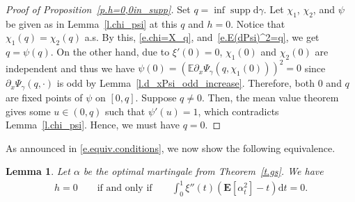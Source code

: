 \documentclass[11pt]{amsart}
\newtheorem{lemma}[proposition]{Lemma}
\theoremstyle{remark}
\theoremstyle{definition}
\numberwithin{equation}{section}
\numberwithin{proposition}{section}
\numberwithin{figure}{section}
\numberwithin{table}{section}
\newcommand{\E}{\mathbb{E}}
\newcommand{\EE}{\mathbf{E}}
\newcommand{\Ll}{\left}
\newcommand{\Rr}{\right}
\renewcommand{\d}{\mathrm{d}}
\newcommand{\1}{\mathbf{1}}
\DeclareMathOperator{\supp}{supp}
\begin{document}
\begin{proof}[Proof of Proposition~\ref{p.h=0,0in_supp}]
Set $q=\inf\supp\d\gamma$.
Let $\chi_1$, $\chi_2$, and $\psi$ be given as in Lemma~\ref{l.chi_psi} at this $q$ and $h=0$. Notice that $\chi_1(q)=\chi_2(q)$ a.s. By this, \eqref{e.chi=X_q}, and~\eqref{e.E(dPsi)^2=q}, we get $q=\psi(q)$. On the other hand, due to $\xi'(0)=0$, $\chi_1(0)$ and $\chi_2(0)$ are independent and thus we have $\psi(0)= \Ll(\E \partial_x\Psi_\gamma(q,\chi_1(0))\Rr)^2=0$ since $\partial_x\Psi_\gamma(q,\cdot)$ is odd by Lemma~\ref{l.d_xPsi_odd_increase}. Therefore, both $0$ and $q$ are fixed points of $\psi$ on $[0,q]$. Suppose $q\neq 0$. Then, the mean value theorem gives some $u\in(0,q)$ such that $\psi'(u)=1$, which contradicts Lemma~\ref{l.chi_psi}. Hence, we must have $q=0$.
\end{proof}

As announced in \eqref{e.equiv.conditions}, we now show the following equivalence.
\begin{lemma}\label{l.h=0_int=0}
Let $\alpha$ be the optimal martingale from Theorem~\ref{t.gs}. We have 
\begin{align}\label{e.h=0_int=0}
    h =0 \qquad\text{if and only if}\qquad  \int_0^1\xi''(t)\Ll(\EE\Ll[\alpha^2_t\Rr]-t\Rr)\d t = 0.
\end{align}
\end{lemma}
\end{document}
